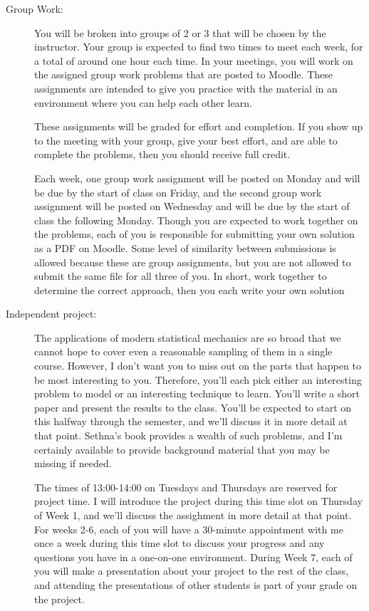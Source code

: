 \documentclass[12pt]{article}
\begin{document}
\begin{description}
  \item[Group Work:] You will be broken into groups of 2 or 3 that will be chosen by the instructor. Your group is expected to find two times to meet each week, for a total of around one hour each time. In your meetings, you will work on the assigned group work problems that are posted to Moodle. These assignments are intended to give you practice with the material in an environment where you can help each other learn.

    These assignments will be graded for effort and completion. If you show up to the meeting with your group, give your best effort, and are able to complete the problems, then you should receive full credit.

    Each week, one group work assignment will be posted on Monday and will be due by the start of class on Friday, and the second group work assignment will be posted on Wednesday and will be due by the start of class the following Monday. Though you are expected to work together on the problems, each of you is responsible for submitting your own solution as a PDF on Moodle. Some level of similarity between submissions is allowed because these are group assignments, but you are not allowed to submit the same file for all three of you. In short, work together to determine the correct approach, then you each write your own solution

    \item[Independent project:]The applications of modern
statistical mechanics are so broad that we cannot hope to cover even a
reasonable sampling of them in a single course. However, I don't want
you to miss out on the parts that happen to be most interesting to
you. Therefore, you'll each pick either an interesting problem to
model or an interesting technique to learn. You'll write a short paper
and present the results to the class. You'll be expected to start on
this halfway through the semester, and we'll discuss it in more detail
at that point. Sethna's book provides a wealth of such problems, and
I'm certainly available to provide background material that you may be
missing if needed.

The times of 13:00-14:00 on Tuesdays and Thursdays are reserved for project time. I will introduce the project during this time slot on Thursday of Week 1, and we'll discuss the assighment in more detail at that point. For weeks 2-6, each of you will have a 30-minute appointment with me once a week during this time slot to discuss your progress and any questions you have in a one-on-one environment. During Week 7, each of you will make a presentation about your project to the rest of the class, and attending the presentations of other students is part of your grade on the project.


\end{description}
\end{document}
